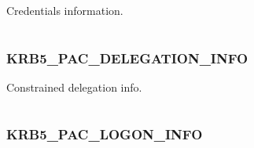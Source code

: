 \documentclass[letterpaper,10pt,english]{sphinxmanual}
\begin{document}
\begin{fulllineitems}
\label{appdev/refs/macros/KRB5_PAC_CREDENTIALS_INFO:KRB5_PAC_CREDENTIALS_INFO}
\end{fulllineitems}


Credentials information.

\begin{tabulary}{\linewidth}{|L|L|}
\hline

 & 
\\\hline
\end{tabulary}



\subsubsection{KRB5\_PAC\_DELEGATION\_INFO}
\label{appdev/refs/macros/KRB5_PAC_DELEGATION_INFO::doc}\label{appdev/refs/macros/KRB5_PAC_DELEGATION_INFO:krb5-pac-delegation-info-data}\label{appdev/refs/macros/KRB5_PAC_DELEGATION_INFO:krb5-pac-delegation-info}

\begin{fulllineitems}
\label{appdev/refs/macros/KRB5_PAC_DELEGATION_INFO:KRB5_PAC_DELEGATION_INFO}
\end{fulllineitems}


Constrained delegation info.

\begin{tabulary}{\linewidth}{|L|L|}
\hline

 & 
\\\hline
\end{tabulary}



\subsubsection{KRB5\_PAC\_LOGON\_INFO}
\label{appdev/refs/macros/KRB5_PAC_LOGON_INFO:krb5-pac-logon-info}\label{appdev/refs/macros/KRB5_PAC_LOGON_INFO:krb5-pac-logon-info-data}\label{appdev/refs/macros/KRB5_PAC_LOGON_INFO::doc}

\begin{fulllineitems}
\label{appdev/refs/macros/KRB5_PAC_LOGON_INFO:KRB5_PAC_LOGON_INFO}
\end{fulllineitems}
\end{document}
